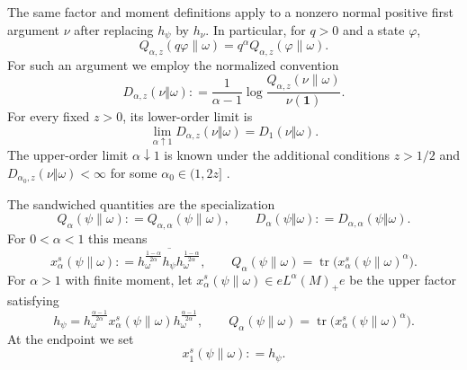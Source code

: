 \documentclass[12pt]{article}
\numberwithin{equation}{section}
\theoremstyle{definition}
\theoremstyle{remark}
\newcommand{\one}{\mathbf 1}
\newcommand{\?}{\overset{?}{=}}
\newcommand{\defeq}{\mathrel{\mathop:}=}
\DeclareMathOperator{\tr}{tr}
\begin{document}
The same factor and moment definitions apply to a nonzero normal positive
first argument $\nu$ after replacing $h_\psi$ by $h_\nu$.  In particular,
for $q>0$ and a state $\varphi$,
\begin{equation}
  Q_{\alpha,z}(q\varphi\|\omega)
  =q^\alpha Q_{\alpha,z}(\varphi\|\omega).
  \label{eq:alpha-z-moment-homogeneity}
\end{equation}
For such an argument we employ the normalized convention
\begin{equation}
  D_{\alpha,z}(\nu\Vert\omega)
  \defeq \frac{1}{\alpha-1}
  \log\frac{Q_{\alpha,z}(\nu\|\omega)}{\nu(\one)}.
  \label{eq:normalized-alpha-z-positive}
\end{equation}
For every fixed $z>0$, its lower-order limit is
\begin{equation}
  \lim_{\alpha\uparrow1}D_{\alpha,z}(\nu\Vert\omega)
  =D_1(\nu\Vert\omega).
  \label{eq:lower-alpha-z-limit}
\end{equation}
The upper-order limit $\alpha\downarrow1$ is known under the additional
conditions $z>1/2$ and
$D_{\alpha_0,z}(\nu\Vert\omega)<\infty$ for some
$\alpha_0\in(1,2z]$ \cite[Theorems~6.7 and~6.9]{Hiai:2024qve}.

The sandwiched quantities are the specialization
\begin{equation}
  Q_\alpha(\psi\|\omega)
  \defeq Q_{\alpha,\alpha}(\psi\|\omega),
  \qquad
  D_\alpha(\psi\Vert\omega)
  \defeq D_{\alpha,\alpha}(\psi\Vert\omega).
  \label{eq:srd-specialization}
\end{equation}
For $0<\alpha<1$ this means
\begin{equation}
  x_\alpha^s(\psi\|\omega)
  \defeq \overline{
  h_\omega^{\frac{1-\alpha}{2\alpha}}
  h_\psi
  h_\omega^{\frac{1-\alpha}{2\alpha}}},
  \qquad
  Q_\alpha(\psi\|\omega)
  =\tr\bigl(x_\alpha^s(\psi\|\omega)^\alpha\bigr).
  \label{eq:lower-srd-factor}
\end{equation}
For $\alpha>1$ with finite moment, let
$x_\alpha^s(\psi\|\omega)\in eL^\alpha(M)_+e$ be the upper factor
satisfying
\begin{equation}
  h_\psi
  =h_\omega^{\frac{\alpha-1}{2\alpha}}
   x_\alpha^s(\psi\|\omega)
   h_\omega^{\frac{\alpha-1}{2\alpha}},
  \qquad
  Q_\alpha(\psi\|\omega)
  =\tr\bigl(x_\alpha^s(\psi\|\omega)^\alpha\bigr).
  \label{eq:upper-srd-factor}
\end{equation}
At the endpoint we set
\begin{equation}
  x_1^s(\psi\|\omega)\defeq h_\psi.
  \label{eq:srd-factor-at-one}
\end{equation}
\end{document}
